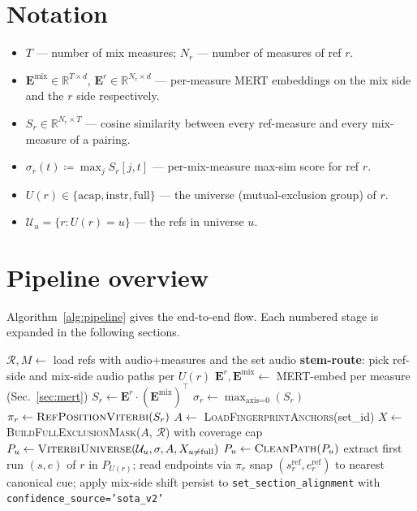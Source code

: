 \documentclass[11pt,a4paper]{article}
\begin{document}
\section{Notation}

\begin{itemize}[leftmargin=1.5em, itemsep=0.1em]
\item $T$ --- number of mix measures; $N_r$ --- number of measures of ref $r$.
\item $\mathbf{E}^{\text{mix}} \in \mathbb{R}^{T \times d}$, $\mathbf{E}^{r} \in \mathbb{R}^{N_r \times d}$ --- per-measure MERT embeddings on the mix side and the $r$ side respectively.
\item $S_r \in \mathbb{R}^{N_r \times T}$ --- cosine similarity between every ref-measure and every mix-measure of a pairing.
\item $\sigma_r(t) \coloneqq \max_j S_r[j, t]$ --- per-mix-measure max-sim score for ref $r$.
\item $U(r) \in \{\text{acap}, \text{instr}, \text{full}\}$ --- the universe (mutual-exclusion group) of $r$.
\item $\mathcal{U}_u = \{r : U(r) = u\}$ --- the refs in universe $u$.
\end{itemize}

\section{Pipeline overview}

Algorithm~\ref{alg:pipeline} gives the end-to-end flow. Each numbered stage is expanded in the following sections.

\begin{algorithm}[h]
\caption{\textsc{SotaAlignSet}$(\text{set\_id})$}
\label{alg:pipeline}
\begin{algorithmic}[1]
\State $\mathcal{R}, M \leftarrow $ load refs with audio+measures and the set audio
    \State \textbf{stem-route}: pick ref-side and mix-side audio paths per $U(r)$
    \State $\mathbf{E}^r, \mathbf{E}^{\text{mix}} \leftarrow$ MERT-embed per measure (Sec.~\ref{sec:mert})
    \State $S_r \leftarrow \mathbf{E}^r \cdot (\mathbf{E}^{\text{mix}})^\top$  
    \State $\sigma_r \leftarrow \max_\text{axis=0}(S_r)$
    \State $\pi_r \leftarrow \textsc{RefPositionViterbi}(S_r)$ 
\EndFor
\State $A \leftarrow$ \textsc{LoadFingerprintAnchors}(set\_id) 
\State $X \leftarrow$ \textsc{BuildFullExclusionMask}($A$, $\mathcal{R}$) with coverage cap 
    \State $P_u \leftarrow \textsc{ViterbiUniverse}(\mathcal{U}_u, \sigma, A, X_{u \ne \text{full}})$ 
    \State $P_u \leftarrow \textsc{CleanPath}(P_u)$ 
\EndFor
{}
    \State extract first run $(s, e)$ of $r$ in $P_{U(r)}$; read endpoints via $\pi_r$
    \State snap $(s^{\text{ref}}_r, e^{\text{ref}}_r)$ to nearest canonical cue; apply mix-side shift
\EndFor
\State persist to \texttt{set\_section\_alignment} with \texttt{confidence\_source='sota\_v2'}
\end{algorithmic}
\end{algorithm}
\end{document}
